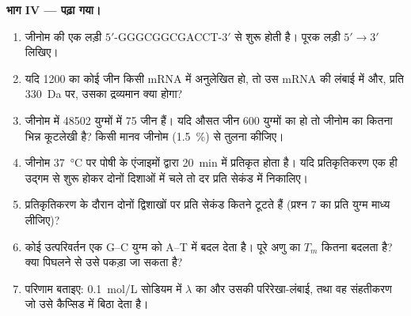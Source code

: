 \begin{problem}
\medskip
\noindent\textbf{भाग IV --- पढ़ा गया।}
\begin{enumerate}[resume]
  \item जीनोम की एक लड़ी $5'$-GGGCGGCGACCT-$3'$ से शुरू होती है। पूरक
        लड़ी $5' \to 3'$ लिखिए।
  \item यदि \num{1200}  का कोई जीन किसी mRNA में अनुलेखित
        हो, तो उस mRNA की लंबाई  में और, प्रति
         \qty{330}{Da} पर, उसका द्रव्यमान क्या होगा?
  \item जीनोम में \num{48502} युग्मों में \qty{75}{} जीन हैं। यदि औसत
        जीन \num{600} युग्मों का हो तो जीनोम का कितना भिन्न कूटलेखी है?
        किसी मानव जीनोम (\qty{1.5}{\%}) से तुलना कीजिए।
  \item जीनोम \qty{37}{\celsius} पर पोषी के एंजाइमों द्वारा
        \qty{20}{min} में प्रतिकृत होता है। यदि प्रतिकृतिकरण एक ही उद्गम
        से शुरू होकर दोनों दिशाओं में चले तो दर  प्रति सेकंड
        में निकालिए।
  \item प्रतिकृतिकरण के दौरान दोनों द्विशाखों पर प्रति सेकंड कितने
         टूटते हैं (प्रश्न 7 का प्रति युग्म माध्य लीजिए)?
  \item कोई उत्परिवर्तन एक G--C युग्म को A--T में बदल देता है। पूरे अणु
        का $T_m$ कितना बदलता है? क्या पिघलने से उसे पकड़ा जा सकता है?
  \item परिणाम बताइए: \qty{0.1}{mol/L} सोडियम में $\lambda$  का  और उसकी परिरेखा-लंबाई, तथा वह संहतीकरण जो उसे कैप्सिड में
        बिठा देता है।
\end{enumerate}
\end{problem}
